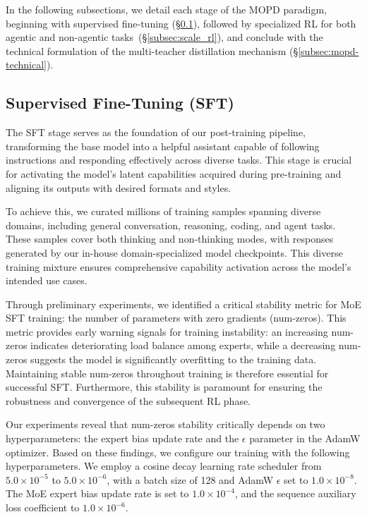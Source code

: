 In the following subsections, we detail each stage of the MOPD paradigm, beginning with supervised fine-tuning (\S\ref{subsec:post_train_sft}), followed by specialized RL for both agentic and non-agentic tasks~(\S\ref{subsec:scale_rl}), and conclude with the technical formulation of the multi-teacher distillation mechanism (\S\ref{subsec:mopd-technical}).


\subsection{Supervised Fine-Tuning (SFT)}
\label{subsec:post_train_sft}

The SFT stage serves as the foundation of our post-training pipeline, transforming the base model into a helpful assistant capable of following instructions and responding effectively across diverse tasks. This stage is crucial for activating the model's latent capabilities acquired during pre-training and aligning its outputs with desired formats and styles.

To achieve this, we curated millions of training samples spanning diverse domains, including general conversation, reasoning, coding, and agent tasks. These samples cover both thinking and non-thinking modes, with responses generated by our in-house domain-specialized model checkpoints. This diverse training mixture ensures comprehensive capability activation across the model's intended use cases.

Through preliminary experiments, we identified a critical stability metric for MoE SFT training: the number of parameters with zero gradients (num-zeros). This metric provides early warning signals for training instability: an increasing num-zeros indicates deteriorating load balance among experts, while a decreasing num-zeros suggests the model is significantly overfitting to the training data. Maintaining stable num-zeros throughout training is therefore essential for successful SFT. Furthermore, this stability is paramount for ensuring the robustness and convergence of the subsequent RL phase.

Our experiments reveal that num-zeros stability critically depends on two hyperparameters: the expert bias update rate and the $\epsilon$ parameter in the AdamW optimizer. Based on these findings, we configure our training with the following hyperparameters. We employ a cosine decay learning rate scheduler from $5.0 \times 10^{-5}$ to $5.0 \times 10^{-6}$, with a batch size of 128 and AdamW $\epsilon$ set to $1.0 \times 10^{-8}$. The MoE expert bias update rate is set to $1.0 \times 10^{-4}$, and the sequence auxiliary loss coefficient to $1.0 \times 10^{-6}$.


